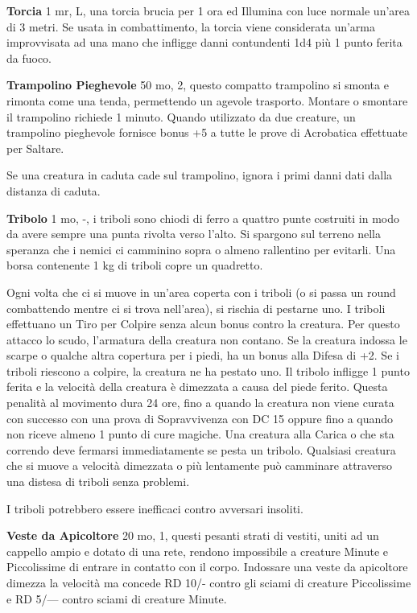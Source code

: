 \documentclass[a4paper,11pt,twoside,openany]{book}
\begin{document}
{\textbf{Torcia} 1 mr, L, una torcia brucia per 1 ora ed Illumina con luce normale un'area di 3 metri. Se usata in combattimento, la torcia viene considerata un'arma improvvisata ad una mano che infligge danni contundenti 1d4 più 1 punto ferita da fuoco. 

\textbf{Trampolino Pieghevole} 50 mo, 2, questo compatto trampolino si smonta e rimonta come una tenda, permettendo un agevole trasporto. Montare o smontare il trampolino richiede 1 minuto. Quando utilizzato da due creature, un trampolino pieghevole fornisce bonus +5 a tutte le prove di Acrobatica effettuate per Saltare.

Se una creatura in caduta cade sul trampolino, ignora i primi danni dati dalla distanza di caduta.

\textbf{Tribolo} 1 mo, -, i triboli sono chiodi di ferro a quattro punte costruiti in modo da avere sempre una punta rivolta verso l'alto. Si spargono sul terreno nella speranza che i nemici ci camminino sopra o almeno rallentino per evitarli. Una borsa contenente 1 kg di triboli copre un quadretto.

Ogni volta che ci si muove in un'area coperta con i triboli (o si passa un round combattendo mentre ci si trova nell'area), si rischia di pestarne uno. I triboli effettuano un Tiro per Colpire senza alcun bonus contro la creatura. Per questo attacco lo scudo, l'armatura della creatura non contano. Se la creatura indossa le scarpe o qualche altra copertura per i piedi, ha un bonus alla Difesa di +2. Se i triboli riescono a colpire, la creatura ne ha pestato uno. Il tribolo infligge 1 punto ferita e la velocità della creatura è dimezzata a causa del piede ferito. Questa penalità al movimento dura 24 ore, fino a quando la creatura non viene curata con successo con una prova di Sopravvivenza con DC 15 oppure fino a quando non riceve almeno 1 punto di cure magiche.
Una creatura alla Carica o che sta correndo deve fermarsi immediatamente se pesta un tribolo. Qualsiasi creatura che si muove a velocità dimezzata o più lentamente può camminare attraverso una distesa di triboli senza problemi.

I triboli potrebbero essere inefficaci contro avversari insoliti.

\textbf{Veste da Apicoltore} 20 mo, 1, questi pesanti strati di vestiti, uniti ad un cappello ampio e dotato di una rete, rendono impossibile a creature Minute e Piccolissime di entrare in contatto con il corpo. Indossare una veste da apicoltore dimezza la velocità ma concede RD 10/- contro gli sciami di creature Piccolissime e RD 5/--- contro sciami di creature Minute.

}
\end{document}
